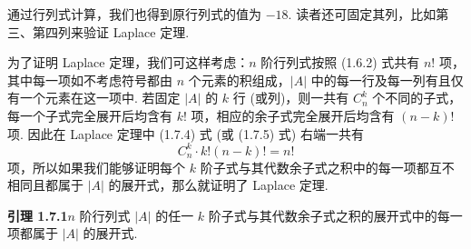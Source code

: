 \documentclass[UTF8, 12pt, fontset=fandol, oneside]{ctexart}
\begin{document}
通过行列式计算，我们也得到原行列式的值为 $-18$. 读者还可固定其列，比如第三、第四列来验证 Laplace 定理.

为了证明 Laplace 定理，我们可这样考虑：$n$ 阶行列式按照 (1.6.2) 式共有 $n!$ 项，其中每一项如不考虑符号都由 $n$ 个元素的积组成，$|A|$ 中的每一行及每一列有且仅有一个元素在这一项中. 若固定 $|A|$ 的 $k$ 行 (或列)，则一共有 $C_n^k$ 个不同的子式，每一个子式完全展开后均含有 $k!$ 项，相应的余子式完全展开后均含有 $(n-k)!$ 项. 因此在 Laplace 定理中 (1.7.4) 式 (或 (1.7.5) 式) 右端一共有
\[
C_n^k\cdot k!(n-k)!=n!
\]
项，所以如果我们能够证明每个 $k$ 阶子式与其代数余子式之积中的每一项都互不相同且都属于 $|A|$ 的展开式，那么就证明了 Laplace 定理.

\noindent\textbf{引理 1.7.1}\quad $n$ 阶行列式 $|A|$ 的任一 $k$ 阶子式与其代数余子式之积的展开式中的每一项都属于 $|A|$ 的展开式.
\end{document}
